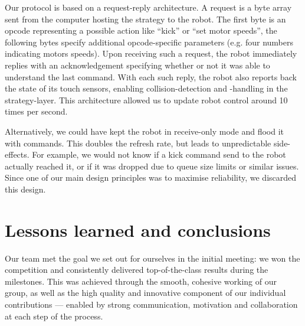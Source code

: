 \documentclass[journal,a4paper,12pt]{IEEEtran}
\begin{document}
Our protocol is based on a request-reply architecture. A request is a byte array sent from the computer hosting the strategy to the robot. The first byte is an opcode representing a possible action like ``kick'' or ``set motor speeds'', the following bytes specify additional opcode-specific parameters (e.g. four numbers indicating motors speeds). Upon receiving such a request, the robot immediately replies with an acknowledgement specifying whether or not it was able to understand the last command. With each such reply, the robot also reports back the state of its touch sensors, enabling collision-detection and -handling in the strategy-layer. This architecture allowed us to update robot control around 10 times per second.

Alternatively, we could have kept the robot in receive-only mode and flood it with commands. This doubles the refresh rate, but leads to unpredictable side-effects. For example, we would not know if a kick command send to the robot actually reached it, or if it was dropped due to queue size limits or similar issues. Since one of our main design principles was to maximise reliability, we discarded this design.


\section{Lessons learned and conclusions}\label{s:conclusion}

Our team met the goal we set out for ourselves in the initial meeting: we won the competition and consistently delivered top-of-the-class results during the milestones. This was achieved through the smooth, cohesive working of our group, as well as the high quality and innovative component of our individual contributions --- enabled by strong communication, motivation and collaboration at each step of the process.
\end{document}
